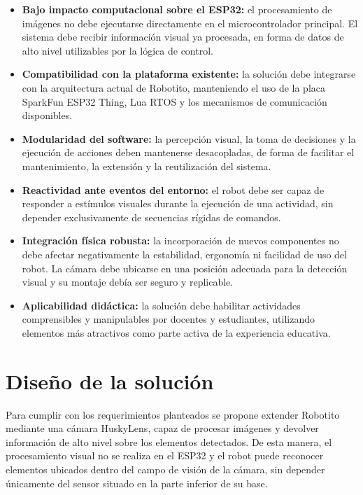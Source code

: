 \documentclass{prgrado}
\begin{document}
\begin{itemize}
    \item \textbf{Bajo impacto computacional sobre el ESP32:} el procesamiento de imágenes no debe ejecutarse directamente en el microcontrolador principal. El sistema debe recibir información visual ya procesada, en forma de datos de alto nivel utilizables por la lógica de control.

    \item \textbf{Compatibilidad con la plataforma existente:} la solución debe integrarse con la arquitectura actual de Robotito, manteniendo el uso de la placa SparkFun ESP32 Thing, Lua RTOS y los mecanismos de comunicación disponibles.

    \item \textbf{Modularidad del software:} la percepción visual, la toma de decisiones y la ejecución de acciones deben mantenerse desacopladas, de forma de facilitar el mantenimiento, la extensión y la reutilización del sistema.

    \item \textbf{Reactividad ante eventos del entorno:} el robot debe ser capaz de responder a estímulos visuales durante la ejecución de una actividad, sin depender exclusivamente de secuencias rígidas de comandos.

    \item \textbf{Integración física robusta:} la incorporación de nuevos componentes no debe afectar negativamente la estabilidad, ergonomía ni facilidad de uso del robot. La cámara debe ubicarse en una posición adecuada para la detección visual y su montaje debía ser seguro y replicable.

    \item \textbf{Aplicabilidad didáctica:} la solución debe habilitar actividades comprensibles y manipulables por docentes y estudiantes, utilizando elementos más atractivos como parte activa de la experiencia educativa.
\end{itemize}

\section{Diseño de la solución}

Para cumplir con los requerimientos planteados se propone extender Robotito mediante una cámara HuskyLens, capaz de procesar imágenes y devolver información de alto nivel sobre los elementos detectados. De esta manera, el procesamiento visual no se realiza en el ESP32 y el robot puede reconocer elementos ubicados dentro del campo de visión de la cámara, sin depender únicamente del sensor situado en la parte inferior de su base.
\end{document}
